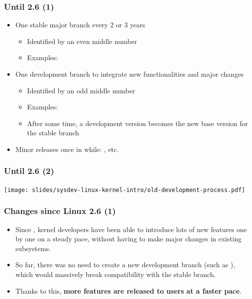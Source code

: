 \begin{frame}
  \frametitle{Until 2.6 (1)}
  \begin{itemize}
  \item One stable major branch every 2 or 3 years
    \begin{itemize}
    \item Identified by an even middle number
    \item Examples: 
    \end{itemize}
  \item One development branch to integrate new functionalities and
    major changes
    \begin{itemize}
    \item Identified by an odd middle number
    \item Examples: 
    \item After some time, a development version becomes the new base
      version for the stable branch
    \end{itemize}
  \item Minor releases once in while: , etc.
  \end{itemize}
\end{frame}

\begin{frame}
  \frametitle{Until 2.6 (2)}
  \begin{center}
    \texttt{[image: slides/sysdev-linux-kernel-intro/old-development-process.pdf]}
  \end{center}
\end{frame}

\begin{frame}
  \frametitle{Changes since Linux 2.6 (1)}
  \begin{itemize}
  \item Since , kernel developers have been able to
    introduce lots of new features one by one on a steady pace,
    without having to make major changes in existing subsystems.
  \item So far, there was no need to create a new development branch
    (such as ), which would massively break compatibility
    with the stable branch.
  \item Thanks to this, {\bf more features are released to users at a
      faster pace}.
  \end{itemize}
\end{frame}

